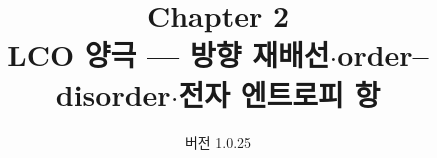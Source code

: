 

\renewcommand{\theequation}{2.\arabic{equation}}
\renewcommand{\thesection}{2.\arabic{section}}

\title{\textbf{\LARGE Chapter 2}\\[0.35em]\Large LCO 양극 --- 방향 재배선$\cdot$order--disorder$\cdot$전자 엔트로피 항}
\author{}
\date{\normalsize 버전 1.0.25}


\maketitle












